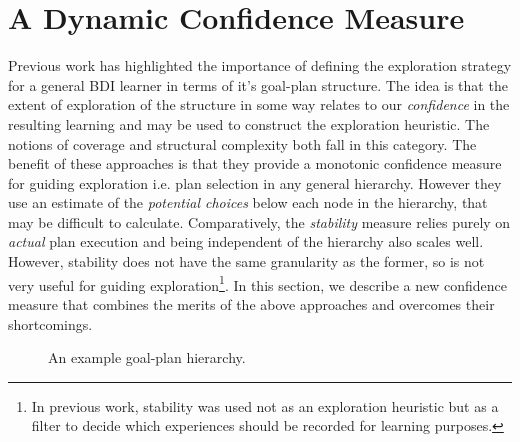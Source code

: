 \section{A Dynamic Confidence Measure}\label{sec:confidence}

Previous work has highlighted the importance of defining the exploration strategy for a general BDI learner in terms of it's goal-plan structure. The idea is that the extent of exploration of the structure in some way relates to our {\em confidence} in the resulting learning and may be used to construct the exploration heuristic. The notions of coverage \cite{singh10:learning} and structural complexity \cite{singh10:extending} both fall in this category. The benefit of these approaches is that they provide a monotonic confidence measure for guiding exploration i.e. plan selection in any general hierarchy. However they use an estimate of the \textit{potential choices} below each node in the hierarchy, that may be difficult to calculate. Comparatively, the \textit{stability} \cite{airiau09:enhancing,singh10:learning} measure relies purely on {\em actual} plan execution and being independent of the hierarchy also scales well. However, stability does not have the same granularity as the former, so is not very useful for guiding exploration\footnote{In previous work\cite{singh10:extending}, stability was used not as an exploration heuristic but as a filter to decide which experiences should be recorded for learning purposes.}. In this section, we describe a new confidence measure that combines the merits of the above approaches and overcomes their shortcomings. 

\begin{figure}[ht]
\begin{center}

\end{center}
\caption{An example goal-plan hierarchy.}
\label{fig:confidence}
\end{figure}

